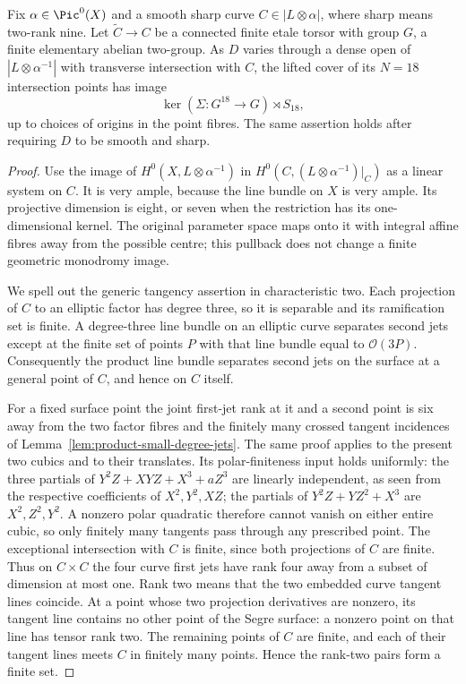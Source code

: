 \begin{lemma}
\label{lem:mixed-lifted-intersection-wreath-candidate}
Fix $\alpha\in\Pic^0(X)$ and a smooth sharp curve
$C\in|L\otimes\alpha|$, where sharp means two-rank nine.
Let $\widetilde C\to C$ be a connected finite etale torsor
with group $G$, a finite elementary abelian two-group.
As $D$ varies through a dense open of $|L\otimes\alpha^{-1}|$
with transverse intersection with $C$, the lifted cover of its
$N=18$ intersection points has image
\[
                     \ker(\Sigma:G^{18}\to G)\rtimes S_{18},
\]
up to choices of origins in the point fibres. The same assertion
holds after requiring $D$ to be smooth and sharp.
\end{lemma}
\begin{proof}
Use the image of $H^0(X,L\otimes\alpha^{-1})$ in
$H^0(C,(L\otimes\alpha^{-1})|_C)$ as a linear system on $C$.
It is very ample, because the line bundle on $X$ is very ample.
Its projective dimension is eight, or seven when the restriction
has its one-dimensional kernel. The original parameter space maps
onto it with integral affine fibres away from the possible centre;
this pullback does not change a finite geometric monodromy image.

We spell out the generic tangency assertion in characteristic two.
Each projection of $C$ to an elliptic factor has degree three,
so it is separable and its ramification set is finite. A degree-three
line bundle on an elliptic curve separates second jets except at
the finite set of points $P$ with that line bundle equal to
$\mathcal O(3P)$. Consequently the product line bundle separates
second jets on the surface at a general point of $C$, and hence
on $C$ itself.

For a fixed surface point the joint first-jet rank at it and a
second point is six away from the two factor fibres and the
finitely many crossed tangent incidences of
Lemma~\ref{lem:product-small-degree-jets}. The same proof
applies to the present two cubics and to their translates.
Its polar-finiteness input holds uniformly: the three partials
of $Y^2Z+XYZ+X^3+aZ^3$ are linearly independent, as seen
from the respective coefficients of $X^2,Y^2,XZ$; the
partials of $Y^2Z+YZ^2+X^3$ are $X^2,Z^2,Y^2$.
A nonzero polar quadratic therefore cannot vanish on either
entire cubic, so only finitely many tangents pass through
any prescribed point. The exceptional intersection with $C$
is finite, since both projections of $C$ are finite. Thus on
$C\times C$ the four curve first jets have rank four away from
a subset of dimension at most one. Rank two means that the two
embedded curve tangent lines coincide. At a point whose two
projection derivatives are nonzero, its tangent line contains
no other point of the Segre surface: a nonzero point on that
line has tensor rank two. The remaining points of $C$ are
finite, and each of their tangent lines meets $C$ in finitely
many points. Hence the rank-two pairs form a finite set.


\end{proof}
